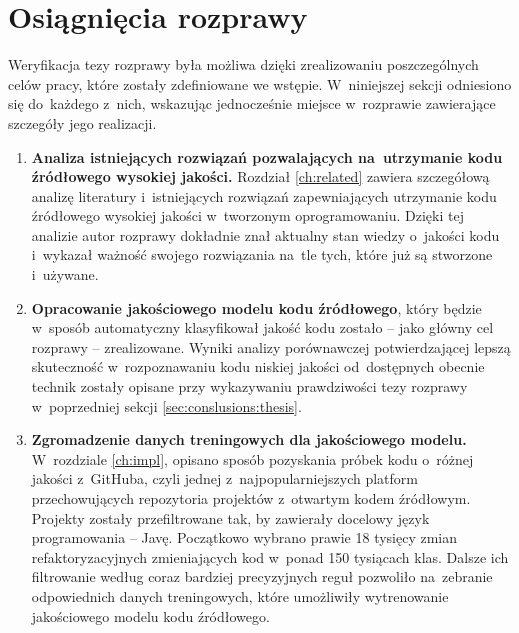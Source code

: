 \documentclass[twoside]{praca}
\begin{document}
\section{Osiągnięcia rozprawy}
Weryfikacja tezy rozprawy była możliwa dzięki zrealizowaniu poszczególnych celów pracy, które zostały zdefiniowane we wstępie. W~niniejszej sekcji odniesiono się do~każdego z~nich, wskazując jednocześnie miejsce w~rozprawie zawierające szczegóły jego realizacji.

\begin{enumerate}
    \item \textbf{Analiza istniejących rozwiązań pozwalających na~utrzymanie kodu źródłowego wysokiej jakości.} Rozdział \ref{ch:related} zawiera szczegółową analizę literatury i~istniejących rozwiązań zapewniających utrzymanie kodu źródłowego wysokiej jakości w~tworzonym oprogramowaniu. Dzięki tej analizie autor rozprawy dokładnie znał aktualny stan wiedzy o~jakości kodu i~wykazał ważność swojego rozwiązania na~tle tych, które już są stworzone i~używane.
    
    \item \textbf{Opracowanie jakościowego modelu kodu źródłowego}, który będzie w~sposób automatyczny klasyfikował jakość kodu zostało -- jako główny cel rozprawy -- zrealizowane. Wyniki analizy porównawczej potwierdzającej lepszą skuteczność w~rozpoznawaniu kodu niskiej jakości od~dostępnych obecnie technik zostały opisane przy wykazywaniu prawdziwości tezy rozprawy w~poprzedniej sekcji \ref{sec:conslusions:thesis}. 
    
    \item \textbf{Zgromadzenie danych treningowych dla jakościowego modelu.} W~rozdziale \ref{ch:impl}, opisano sposób pozyskania próbek kodu o~różnej jakości z~GitHuba, czyli jednej z~najpopularniejszych platform przechowujących repozytoria projektów z~otwartym kodem źródłowym. Projekty zostały przefiltrowane tak, by zawierały docelowy język programowania -- Javę. Początkowo wybrano prawie 18 tysięcy zmian refaktoryzacyjnych zmieniających kod w~ponad 150 tysiącach klas. Dalsze ich filtrowanie według coraz bardziej precyzyjnych reguł pozwoliło na~zebranie odpowiednich danych treningowych, które umożliwiły wytrenowanie jakościowego modelu kodu źródłowego. 
    

\end{enumerate}
\end{document}
